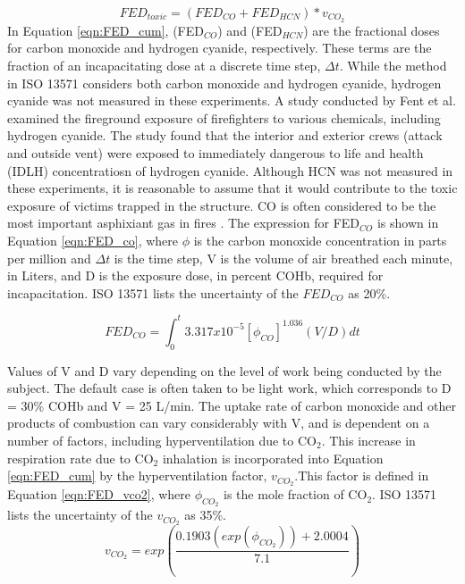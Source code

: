 \documentclass[12pt,oneside]{article}
\begin{document}
\begin{equation}\label{eqn:FED_cum}FED_{toxic}=(FED_{CO}+FED_{HCN})*v_{CO_2}\end{equation}
In Equation \ref{eqn:FED_cum},  (FED$_{CO}$) and  (FED$_{HCN}$) are the fractional doses for carbon monoxide and hydrogen cyanide, respectively. These terms are the fraction of an incapacitating dose at a discrete time step, $\Delta t$. While the method in ISO 13571 considers both carbon monoxide and hydrogen cyanide, hydrogen cyanide was not measured in these experiments. A study conducted by Fent et al. \cite{Fent:2017} examined the fireground exposure of firefighters to various chemicals, including hydrogen cyanide. The study found that the interior and exterior crews (attack and outside vent) were exposed to immediately dangerous to life and health (IDLH) concentratiosn of hydrogen cyanide. Although HCN was not measured in these experiments, it is reasonable to assume that it would contribute to the toxic exposure of victims trapped in the structure. CO is often considered to be the most important asphixiant gas in fires \cite{SFPE:Purser}. The expression for FED$_{CO}$ is shown in Equation \ref{eqn:FED_co}, where $\phi$ is the carbon monoxide concentration in parts per million and $\Delta t $ is the time step, V is the volume of air breathed each minute, in Liters, and D is the exposure dose, in percent COHb, required for incapacitation. ISO 13571 \cite{ISO13571} lists the uncertainty of the $FED_{CO}$ as 20\%.

\begin{equation}\label{eqn:FED_co}FED_{CO} = \int_{0}^{t} 3.317 x 10^{-5} [\phi_{CO}]^{1.036}(V/D)dt\end{equation}

Values of V and D vary depending on the level of work being conducted by the subject. The default case is often taken to be light work, which corresponds to D = 30\% COHb and V = 25 L/min. The uptake rate of carbon monoxide and other products of combustion can vary considerably with V, and is dependent on a number of factors, including hyperventilation due to CO$_2$. This increase in respiration rate due to CO$_2$ inhalation is incorporated into Equation \ref{eqn:FED_cum} by the hyperventilation factor, $v_{CO_2}$.This factor is defined in Equation \ref{eqn:FED_vco2}, where $\phi_{CO_2}$ is the mole fraction of CO$_2$. ISO 13571 \cite{ISO13571} lists the uncertainty of the $v_{CO_2}$ as 35\%.
\begin{equation}\label{eqn:FED_vco2}v_{CO_2}=exp(\frac{0.1903 (exp(\phi_{CO_2}))+2.0004}{7.1})\end{equation}
\end{document}
